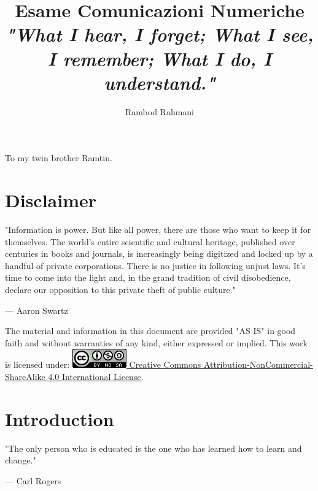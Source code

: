 \documentclass[12pt,oneside,openany]{memoir}
\title{%
  Esame Comunicazioni Numeriche\\
  \vspace{1cm}
  \large \textit{"What I hear, I forget; What I see, I remember; What I do, I understand."}}
\author{Rambod Rahmani}
\numberwithin{equation}{subsection}
\newenvironment{dedication}
{
    \afterpage{\blankpage}
    \clearpage
    \thispagestyle{empty}
    \vspace*{\stretch{1}}
    \itshape
    \raggedleft
    \afterpage{\blankpage}
}
{
    \par
    \vspace{\stretch{1}}
    \clearpage
}
\newcommand{\blankpage}
{
    \null
    \thispagestyle{empty}%
    \addtocounter{page}{-1}%
    \newpage
}
\begin{document}
\renewcommand{\rmdefault}{cmr}

\maketitle
{}

\begin{dedication}
To my twin brother Ramtin.
\end{dedication}


\newpage
{}
\tableofcontents
\afterpage{\blankpage}

\newpage
{}


\chapter{Disclaimer}
\epigraph{"Information is power. But like all power, there are those who want to keep it for themselves. The world's entire scientific and cultural heritage, published over centuries in books and journals, is increasingly being digitized and locked up by a handful of private corporations. There is no justice in following unjust laws. It's time to come into the light and, in the grand tradition of civil disobedience, declare our opposition to this private theft of public culture."}{--- \textup{Aaron Swartz}}

The material and information in this document are provided "AS IS" in good faith and without warranties of any kind, either expressed or implied.
\bigbreak\noindent
This work is licensed under:
\bigbreak\noindent
\href{http://creativecommons.org/licenses/by-nc-sa/4.0/}{\includegraphics[height=\baselineskip]{images/cc_88x31.png} Creative Commons Attribution-NonCommercial-ShareAlike 4.0 International License}.


\chapter{Introduction}
\epigraph{"The only person who is educated is the one who has learned how to learn and change."}{--- \textup{Carl Rogers}}
\end{document}
